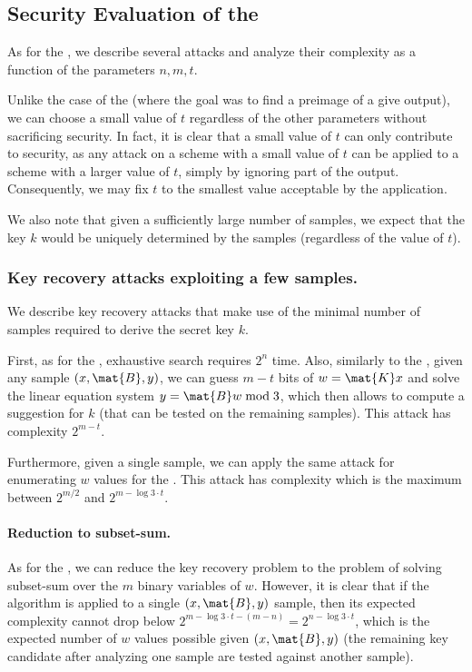 


\subsection{Security Evaluation of the \ttwPRF}
\label{sec:basicprf}

As for the \ttOWF, we describe several attacks and analyze their complexity as a function of the parameters $n,m,t$.

Unlike the case of the \ttOWF (where the goal was to find a preimage of a give output),
we can choose a small value of $t$ regardless of the other parameters without sacrificing security. In fact, it is clear that a small value of $t$ can only contribute to security, as any attack on a scheme with a small value of $t$ can be applied to a scheme with a larger value of $t$, simply by ignoring part of the output. Consequently, we may fix $t$ to the smallest value acceptable by the application.

We also note that given a sufficiently large number of samples, we expect that the key $k$ would be uniquely determined by the samples (regardless of the value of $t$).

\subsubsection{Key recovery attacks exploiting a few samples.}
We describe key recovery attacks that make use of the minimal number of samples required to derive the secret key $k$.

First, as for the \ttOWF, exhaustive search requires $2^{n}$ time. Also,
similarly to the \ttOWF, given any sample $(x,\mat{B},y)$, we can guess $m - t$ bits of $w = \mat{K} x$ and solve the linear equation system $y = \mat{B} w \bmod 3$, which then allows to compute a suggestion for $k$ (that can be tested on the remaining samples). This attack has complexity $2^{m-t}$.

Furthermore, given a single sample, we can apply the same attack for enumerating $w$ values for the \ttOWF.
This attack has complexity which is the maximum between $2^{m/2}$ and $2^{m - \log 3 \cdot t}$.

\paragraph{Reduction to subset-sum.}
As for the \ttOWF, we can reduce the key recovery problem to the problem of solving subset-sum over the $m$ binary variables of $w$. However, it is clear that if the algorithm is applied to a single $(x,\mat{B},y)$ sample, then its expected complexity cannot drop below $2^{m - \log 3 \cdot t - (m -n)} = 2^{n - \log 3 \cdot t}$, which is the expected number of $w$ values possible given $(x,\mat{B},y)$
(the remaining key candidate after analyzing one sample are tested against another sample).


